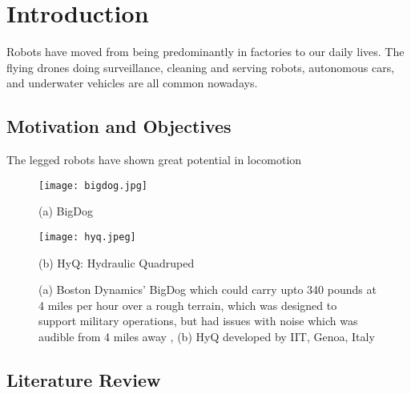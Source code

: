 
\chapter{Introduction} %

\label{Chapter1} %


Robots have moved from being predominantly in factories to our daily lives. The flying drones doing surveillance, cleaning and serving robots, autonomous cars, and underwater vehicles are all common nowadays.

\newpage

\section{Motivation and Objectives}

The legged robots have shown great potential in locomotion

\begin{figure}[!htb]
\centering
\begin{minipage}{.5\textwidth}
  \centering
  \texttt{[image: bigdog.jpg]}
  \caption*{(a) BigDog}
\end{minipage}%
\begin{minipage}{.5\textwidth}
  \centering
  \texttt{[image: hyq.jpeg]}
  \caption*{(b) HyQ: Hydraulic Quadruped}
\end{minipage}
\caption[(a) Boston Dynamics' BigDog, (b) HyQ developed by IIT, Genoa, Italy]{(a) Boston Dynamics' BigDog which could carry upto 340 pounds at 4 miles per hour over a rough terrain, which was designed to support military operations, but had issues with noise which was audible from 4 miles away \citep{raibert2008bigdog}, (b) HyQ developed by IIT, Genoa, Italy\citep{semini2011design}}
\end{figure}


\section{Literature Review}

